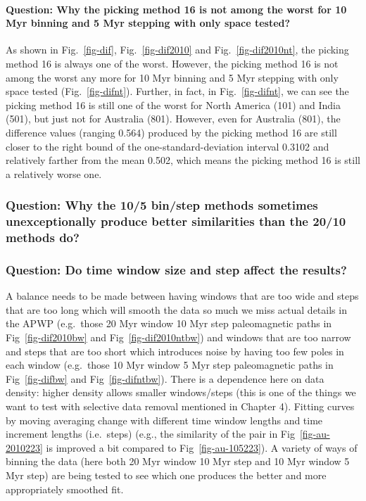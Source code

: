 \paragraph{Question: Why the picking method 16 is not among the worst for
10 Myr binning and 5 Myr stepping with only space tested?}

As shown in Fig.~\ref{fig-dif}, Fig.~\ref{fig-dif2010} and
Fig.~\ref{fig-dif2010nt}, the picking method 16 is always one of the worst.
However, the picking method 16 is not among the worst any more for 10 Myr
binning and 5 Myr stepping with only space tested (Fig.~\ref{fig-difnt}).
Further, in fact, in Fig.~\ref{fig-difnt}, we can see the picking method 16 is
still one of the worst for North America (101) and India (501), but just not for
Australia (801). However, even for Australia (801), the difference values
(ranging 0.564) produced by the picking method 16 are still
closer to the right bound of the one-standard-deviation interval
0.3102 and relatively farther from the mean 0.502, which means
the picking method 16 is still a relatively worse one.

\subsubsection{Question: Why the 10/5 bin/step methods sometimes unexceptionally
produce better similarities than the 20/10 methods do?}

\subsubsection{Question: Do time window size and step affect the results?}

A balance needs to be made between having windows that are too wide and steps
that are too long which will smooth the data so much we miss actual details in
the APWP (e.g.\ those 20 Myr window 10 Myr step paleomagnetic paths in
Fig~\ref{fig-dif2010bw} and Fig~\ref{fig-dif2010ntbw}) and windows that are too
narrow and steps that are too short which introduces noise by having too few
poles in each window (e.g.\ those 10 Myr window 5 Myr step paleomagnetic paths in
Fig~\ref{fig-difbw} and Fig~\ref{fig-difntbw}). There is a dependence here on
data density: higher density allows smaller windows/steps (this is one of the
things we want to test with selective data removal mentioned in Chapter 4).
Fitting curves by moving averaging change with different time window lengths and
time increment lengths (i.e.\ steps) (e.g., the similarity of the pair in
Fig~\ref{fig-au-2010223} is improved a bit compared to Fig~\ref{fig-au-105223}).
A variety of ways of binning the data (here both 20 Myr window 10 Myr step and
10 Myr window 5 Myr step) are being tested to see which one produces the better
and more appropriately smoothed fit.

